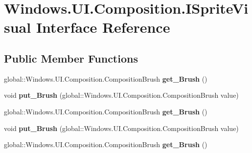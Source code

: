 \hypertarget{interface_windows_1_1_u_i_1_1_composition_1_1_i_sprite_visual}{}\section{Windows.\+U\+I.\+Composition.\+I\+Sprite\+Visual Interface Reference}
\label{interface_windows_1_1_u_i_1_1_composition_1_1_i_sprite_visual}
\subsection*{Public Member Functions}
\begin{DoxyCompactItemize}
\item 
\mbox{\label{interface_windows_1_1_u_i_1_1_composition_1_1_i_sprite_visual_a3b31b335015361eb884a44af879982d1}} 
global\+::\+Windows.\+U\+I.\+Composition.\+Composition\+Brush {\bfseries get\+\_\+\+Brush} ()
\item 
\mbox{\label{interface_windows_1_1_u_i_1_1_composition_1_1_i_sprite_visual_ac9179b3904c6513518582cb560901df5}} 
void {\bfseries put\+\_\+\+Brush} (global\+::\+Windows.\+U\+I.\+Composition.\+Composition\+Brush value)
\item 
\mbox{\label{interface_windows_1_1_u_i_1_1_composition_1_1_i_sprite_visual_a3b31b335015361eb884a44af879982d1}} 
global\+::\+Windows.\+U\+I.\+Composition.\+Composition\+Brush {\bfseries get\+\_\+\+Brush} ()
\item 
\mbox{\label{interface_windows_1_1_u_i_1_1_composition_1_1_i_sprite_visual_ac9179b3904c6513518582cb560901df5}} 
void {\bfseries put\+\_\+\+Brush} (global\+::\+Windows.\+U\+I.\+Composition.\+Composition\+Brush value)
\item 
\mbox{\label{interface_windows_1_1_u_i_1_1_composition_1_1_i_sprite_visual_a3b31b335015361eb884a44af879982d1}} 
global\+::\+Windows.\+U\+I.\+Composition.\+Composition\+Brush {\bfseries get\+\_\+\+Brush} ()
\item 

\end{DoxyCompactItemize}
